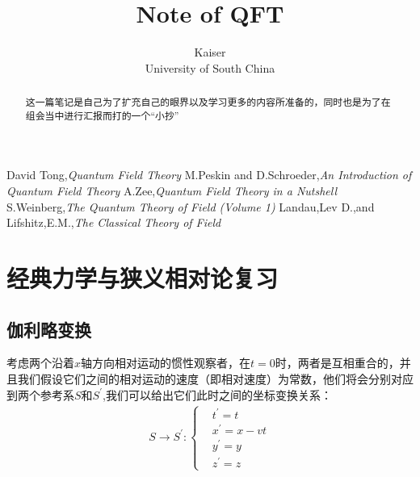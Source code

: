 \documentclass{article}
\title{Note of QFT}
\author{Kaiser\\University of South China}
\begin{document}
\maketitle

\begin{abstract}
    \normalsize
    这一篇笔记是自己为了扩充自己的眼界以及学习更多的内容所准备的，同时也是为了在组会当中进行汇报而打的一个“小抄”
\end{abstract}

\begin{center}
    \large
    \begin{thebibliography}{99} 
         David Tong,\textit{Quantum Field Theory}
         M.Peskin and D.Schroeder,\textit{An Introduction of Quantum Field Theory}
         A.Zee,\textit{Quantum Field Theory in a Nutshell}
         S.Weinberg,\textit{The Quantum Theory of Field (Volume 1)}
         Landau,Lev D.,and Lifshitz,E.M.,\textit{The Classical Theory of Field}
    \end{thebibliography}
\end{center}




\begin{center}
    \tableofcontents
\end{center}
\newpage





\section{经典力学与狭义相对论复习}

\subsection{伽利略变换}
考虑两个沿着$x$轴方向相对运动的惯性观察者，在$t=0$时，两者是互相重合的，并且我们假设它们之间的相对运动的速度（即相对速度）为常数，他们将会分别对应到两个参考系$S$和$S^\prime$,我们可以给出它们此时之间的坐标变换关系：
\begin{align*}
    S\to S^\prime:
    \begin{cases}
        &t^\prime=t\\
        &x^\prime=x-vt\\
        &y^\prime=y\\
        &z^\prime=z
    \end{cases}
\end{align*}
\end{document}
